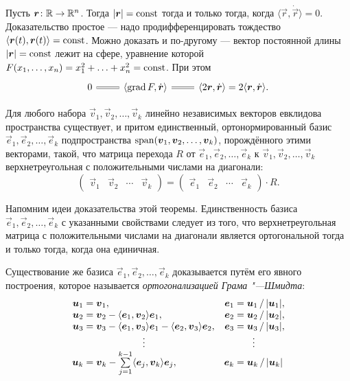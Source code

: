 Пусть $\boldsymbol{r}\colon \mathbb{R} \to \mathbb{R}^n$. Тогда $\left\lvert\boldsymbol{r}\right\rvert = \mathrm{const}$ тогда и только тогда, когда $\langle \vec{r}, \dot{\vec{r}} \rangle = 0$. Доказательство простое --- надо продифференцировать тождество $\langle \boldsymbol{r}(t), \boldsymbol{r}(t) \rangle = \mathrm{const}$. Можно доказать и по-другому --- вектор постоянной длины $\left\lvert\boldsymbol{r}\right\rvert = \mathrm{const}$ лежит на сфере, уравнение которой $F(x_1, \ldots, x_n) = x_1^2 + \ldots + x_n^2 = \mathrm{const}$. При этом
\[\begin{tikzcd}
	{0} & {\langle\grad{F}, \dot{\vec{r}}\rangle} & {\langle 2\vec{r}, \dot{\vec{r}}\rangle = 2\langle\vec{r}, \dot{\vec{r}}\rangle}.
	\arrow[equals, from=1-2, to=1-1]
	\arrow[equals, from=1-2, to=1-3]
\end{tikzcd}\]

\begin{theorem}
	Для любого набора $\vec{v}_1, \vec{v}_2, \ldots, \vec{v}_k$ линейно независимых векторов евклидова пространства существует, и притом единственный, ортонормированный базис $\vec{e}_1, \vec{e}_2, \ldots, \vec{e}_k$ подпространства $\operatorname{span}(\boldsymbol{v}_1, \boldsymbol{v}_2, \ldots, \boldsymbol{v}_k)$, порождённого этими векторами, такой, что матрица перехода $R$ от $\vec{e}_1, \vec{e}_2, \ldots, \vec{e}_k$ к $\vec{v}_1, \vec{v}_2, \ldots, \vec{v}_k$ верхнетреугольная с положительными числами на диагонали:
	\[
		\begin{pmatrix}
			\vec{v}_1 & \vec{v}_2 & \cdots & \vec{v}_k
		\end{pmatrix} =
		\begin{pmatrix}
			\vec{e}_1 & \vec{e}_2 & \cdots & \vec{e}_k
		\end{pmatrix} \cdot R.
	\]
\end{theorem}

Напомним идеи доказательства этой теоремы. Единственность базиса $\vec{e}_1, \vec{e}_2, \ldots, \vec{e}_k$ с указанными свойствами следует из того, что верхнетреугольная матрица с положительными числами на диагонали является ортогональной тогда и только тогда, когда она единичная.

Существование же базиса $\vec{e}_1, \vec{e}_2, \ldots, \vec{e}_k$ доказывается путём его явного построения, которое называется \textit{ортогонализацией Грама "---Шмидта}:
\[
	\begin{array}{r@{\;}l@{\quad}r@{\;}l}
		\vec{u}_1 = & \vec{v}_1, & \vec{e}_1 = & \vec{u}_1\,/\,|\vec{u}_1|, \\
		\vec{u}_2 = & \vec{v}_2 - \langle \vec{e}_1, \vec{v}_2 \rangle \vec{e}_1, & \vec{e}_2 = & \vec{u}_2\,/\,|\vec{u}_2|, \\
		\vec{u}_3 = & \vec{v}_3 - \langle \vec{e}_1, \vec{v}_3 \rangle \vec{e}_1 - \langle \vec{e}_2, \vec{v}_3 \rangle \vec{e}_2, & \vec{e}_3 = & \vec{u}_3\,/\,|\vec{u}_3|, \\
			& \hspace{1.7cm} \vdots & & \hspace{.2cm} \vdots \\
		\vec{u}_k = & \vec{v}_k - \sum\limits_{j=1}^{k-1} \langle \vec{e}_j, \vec{v}_k \rangle \vec{e}_j, & \vec{e}_k = & \vec{u}_k\,/\,|\vec{u}_k|
	\end{array}
\]

